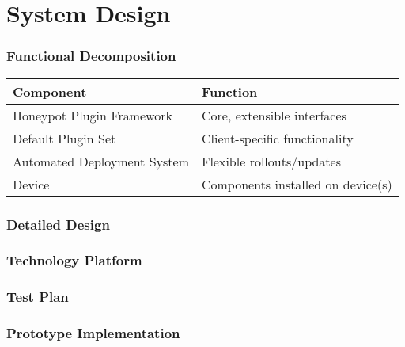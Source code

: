 \section{System Design}

\begin{frame}
\frametitle{Functional Decomposition}

\begin{tabular}{l | l}
\toprule
\textbf{Component} & \textbf{Function} \\
\midrule
Honeypot Plugin Framework & Core, extensible interfaces \\
Default Plugin Set & Client-specific functionality \\
Automated Deployment System & Flexible rollouts/updates \\
Device & Components installed on device(s) \\
\bottomrule
\end{tabular}

\end{frame}

\begin{frame}
\frametitle{Detailed Design}


\end{frame}

\begin{frame}
\frametitle{Technology Platform}


\end{frame}

\begin{frame}
\frametitle{Test Plan}


\end{frame}

\begin{frame}
\frametitle{Prototype Implementation}


\end{frame}
